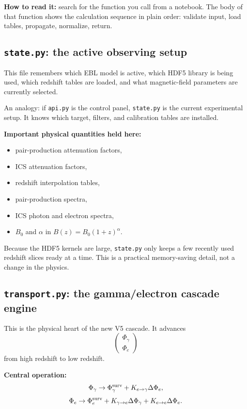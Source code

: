 \documentclass[11pt]{article}
\newcommand{\code}[1]{\texttt{#1}}
\begin{document}
\textbf{How to read it:} search for the function you call from a notebook. The
body of that function shows the calculation sequence in plain order: validate
input, load tables, propagate, normalize, return.

\subsection{\code{state.py}: the active observing setup}

This file remembers which EBL model is active, which HDF5 library is being
used, which redshift tables are loaded, and what magnetic-field parameters are
currently selected.

An analogy: if \code{api.py} is the control panel, \code{state.py} is the
current experimental setup. It knows which target, filters, and calibration
tables are installed.

\textbf{Important physical quantities held here:}
\begin{itemize}
  \item pair-production attenuation factors,
  \item ICS attenuation factors,
  \item redshift interpolation tables,
  \item pair-production spectra,
  \item ICS photon and electron spectra,
  \item $B_0$ and $\alpha$ in $B(z)=B_0(1+z)^\alpha$.
\end{itemize}

Because the HDF5 kernels are large, \code{state.py} only keeps a few recently
used redshift slices ready at a time. This is a practical memory-saving detail,
not a change in the physics.

\subsection{\code{transport.py}: the gamma/electron cascade engine}

This is the physical heart of the new V5 cascade. It advances
\[
  \begin{pmatrix}\Phi_\gamma\\ \Phi_e\end{pmatrix}
\]
from high redshift to low redshift.

\textbf{Central operation:}
\[
  \Phi_\gamma \rightarrow
  \Phi_\gamma^{\rm surv}
  + K_{e\rightarrow\gamma}\Delta\Phi_e,
\]
\[
  \Phi_e \rightarrow
  \Phi_e^{\rm surv}
  + K_{\gamma\rightarrow e}\Delta\Phi_\gamma
  + K_{e\rightarrow e}\Delta\Phi_e .
\]
\end{document}
